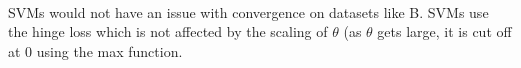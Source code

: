 \begin{answer}\\
SVMs would not have an issue with convergence on datasets like B. SVMs use the hinge loss which is not affected by the scaling of $\theta$ (as $\theta$ gets large, it is cut off at 0 using the max function.
\end{answer}
